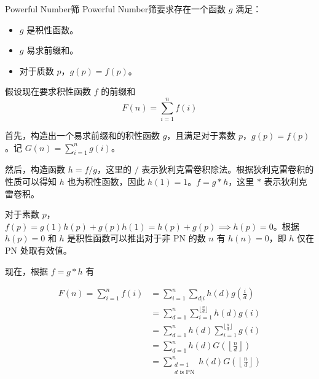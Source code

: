 \documentclass[UTF8]{beamer}
\begin{document}
    \begin{frame}{Powerful Number筛}
        Powerful Number筛要求存在一个函数 $g$ 满足：\\
\begin{itemize}
    \item $g$ 是积性函数。\\
    \item $g$ 易求前缀和。\\
    \item 对于质数 $p$，$g(p) = f(p)$。\\
\end{itemize}
假设现在要求积性函数 $f$ 的前缀和 
$$
F(n) = \sum_{i=1}^{n} f(i)
$$
    \end{frame}
    \begin{frame}
        首先，构造出一个易求前缀和的积性函数 $g$，且满足对于素数 $p$，$g(p) = f(p)$。记 
$G(n) = \sum_{i=1}^{n} g(i)$。

然后，构造函数 $h = f / g$，这里的 $/$ 表示狄利克雷卷积除法。根据狄利克雷卷积的性质可以得知 $h$ 也为积性函数，因此 $h(1) = 1$。$f = g \ast h$，这里 $\ast$ 表示狄利克雷卷积。

对于素数 $p$，$f(p) = g(1)h(p) + g(p)h(1) = h(p) + g(p) \implies h(p) = 0$。根据 $h(p)=0$ 和 $h$ 是积性函数可以推出对于非 PN 的数 $n$ 有 $h(n) = 0$，即 $h$ 仅在 PN 处取有效值。
    \end{frame}
\begin{frame}
现在，根据 $f = g \ast h$ 有
 
$$
\begin{aligned}
F(n) = \sum_{i = 1}^{n} f(i)&= \sum_{i = 1}^{n} \sum_{d|i} h(d) g\left(\frac{i}{d}\right)\\
     &= \sum_{d=1}^{n} \sum_{i=1}^{\lfloor \frac{n}{d}\rfloor} h(d) g(i)\\
     &= \sum_{d=1}^{n} h(d) \sum_{i=1}^{\lfloor \frac{n}{d}\rfloor}  g(i) \\    
     &= \sum_{d=1}^{n} h(d) G\left(\left\lfloor \frac{n}{d}\right\rfloor\right)\\
     &= \sum_{\substack{d=1 \\ d \text{ is PN}}}^{n}h(d) G\left(\left\lfloor \frac{n}{d}\right\rfloor\right)
\end{aligned}
$$
\end{frame}
\end{document}
